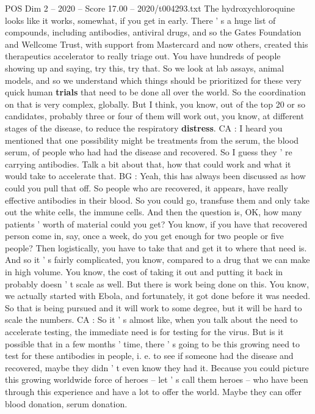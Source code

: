 \begin{textsample}{POS Dim 2 – 2020 – Score 17.00 – 2020/t004293.txt}
The hydroxychloroquine looks like it works, somewhat, if you get in early.
There ' s a huge list of compounds, including antibodies, antiviral drugs, and so the Gates Foundation and Wellcome Trust, with support from Mastercard and now others, created this therapeutics accelerator to really triage out.
You have hundreds of people showing up and saying, try this, try that.
So we look at lab assays, animal models, and so we understand which things should be prioritized for these very quick human \textbf{trials} that need to be done all over the world.
So the coordination on that is very complex, globally.
But I think, you know, out of the top 20 or so candidates, probably three or four of them will work out, you know, at different stages of the disease, to reduce the respiratory \textbf{distress}.
CA : I heard you mentioned that one possibility might be treatments from the serum, the blood serum, of people who had had the disease and recovered.
So I guess they ' re carrying antibodies.
Talk a bit about that, how that could work and what it would take to accelerate that.
BG : Yeah, this has always been discussed as how could you pull that off.
So people who are recovered, it appears, have really effective antibodies in their blood.
So you could go, transfuse them and only take out the white cells, the immune cells.
And then the question is, OK, how many patients ' worth of material could you get?
You know, if you have that recovered person come in, say, once a week, do you get enough for two people or five people?
Then logistically, you have to take that and get it to where that need is.
And so it ' s fairly complicated, you know, compared to a drug that we can make in high volume.
You know, the cost of taking it out and putting it back in probably doesn ' t scale as well.
But there is work being done on this.
You know, we actually started with Ebola, and fortunately, it got done before it was needed.
So that is being pursued and it will work to some degree, but it will be hard to scale the numbers.
CA : So it ' s almost like, when you talk about the need to accelerate testing, the immediate need is for testing for the virus.
But is it possible that in a few months ' time, there ' s going to be this growing need to test for these antibodies in people, i. e. to see if someone had the disease and recovered, maybe they didn ' t even know they had it.
Because you could picture this growing worldwide force of heroes -- let ' s call them heroes -- who have been through this experience and have a lot to offer the world.
Maybe they can offer blood donation, serum donation.

\end{textsample}
